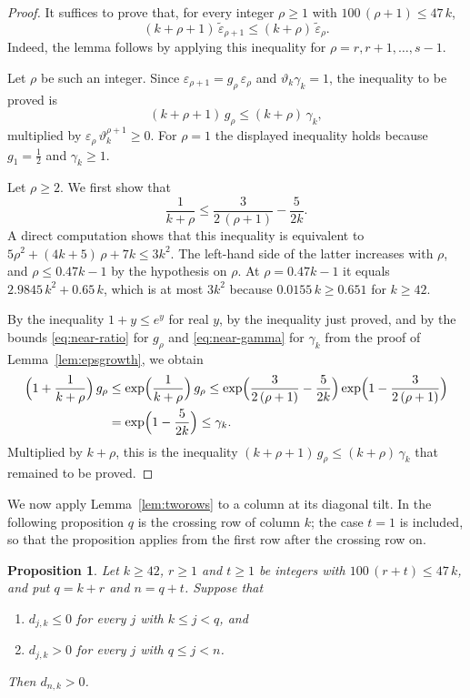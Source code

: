 \documentclass{amsart}
\makeatletter
\newtheorem{proposition}[theorem]{Proposition}
\theoremstyle{definition}
\theoremstyle{remark}
\numberwithin{equation}{section}
\def\subsection{\@startsection{subsection}{2}\z@{.5\linespacing\@plus.7\linespacing}{-.5em}{\normalfont\bfseries\boldmath}}
\makeatother
\begin{document}
\begin{proof}
It suffices to prove that, for every integer $\rho\ge 1$ with $100\,(\rho+1)\le 47\,k$,
\[
(k+\rho+1)\,\tilde\varepsilon_{\rho+1}\le(k+\rho)\,\tilde\varepsilon_\rho.
\]
Indeed, the lemma follows by applying this inequality for $\rho=r,r+1,\dots,s-1$.

Let $\rho$ be such an integer. Since $\varepsilon_{\rho+1}=g_\rho\,\varepsilon_\rho$ and $\vartheta_k\gamma_k=1$, the inequality to be proved is
\[
(k+\rho+1)\,g_\rho\le(k+\rho)\,\gamma_k,
\]
multiplied by $\varepsilon_\rho\,\vartheta_k^{\rho+1}\ge 0$. For $\rho=1$ the displayed inequality holds because $g_1=\frac12$ and $\gamma_k\ge 1$.

Let $\rho\ge 2$. We first show that
\[
\frac{1}{k+\rho}\le\frac{3}{2\,(\rho+1)}-\frac{5}{2k}.
\]
A direct computation shows that this inequality is equivalent to $5\rho^2+(4k+5)\,\rho+7k\le 3k^2$. The left-hand side of the latter increases with $\rho$, and $\rho\le 0.47k-1$ by the hypothesis on $\rho$. At $\rho=0.47k-1$ it equals $2.9845\,k^2+0.65\,k$, which is at most $3k^2$ because $0.0155\,k\ge 0.651$ for $k\ge 42$.

By the inequality $1+y\le e^y$ for real $y$, by the inequality just proved, and by the bounds \eqref{eq:near-ratio} for $g_\rho$ and \eqref{eq:near-gamma} for $\gamma_k$ from the proof of Lemma~\ref{lem:epsgrowth}, we obtain
\begin{align*}
\Bigl(1+\frac{1}{k+\rho}\Bigr)\,g_\rho&\le\exp\Bigl(\frac{1}{k+\rho}\Bigr)\,g_\rho
\le\exp\Bigl(\frac{3}{2\,(\rho+1)}-\frac{5}{2k}\Bigr)\exp\Bigl(1-\frac{3}{2\,(\rho+1)}\Bigr)\\
&=\exp\Bigl(1-\frac{5}{2k}\Bigr)\le\gamma_k .
\end{align*}
Multiplied by $k+\rho$, this is the inequality $(k+\rho+1)\,g_\rho\le(k+\rho)\,\gamma_k$ that remained to be proved.
\end{proof}

\subsection{Rows up to $k+0.47k$}\label{subsec:near-rows}

We now apply Lemma~\ref{lem:tworows} to a column at its diagonal tilt. In the following proposition $q$ is the crossing row of column $k$; the case $t=1$ is included, so that the proposition applies from the first row after the crossing row on.

\begin{proposition}\label{prop:nearrows}
Let $k\ge 42$, $r\ge 1$ and $t\ge 1$ be integers with $100\,(r+t)\le 47\,k$, and put $q=k+r$ and $n=q+t$. Suppose that
\begin{enumerate}
\item $d_{j,k}\le 0$ for every $j$ with $k\le j<q$, and
\item $d_{j,k}>0$ for every $j$ with $q\le j<n$.
\end{enumerate}
Then $d_{n,k}>0$.
\end{proposition}
\end{document}
